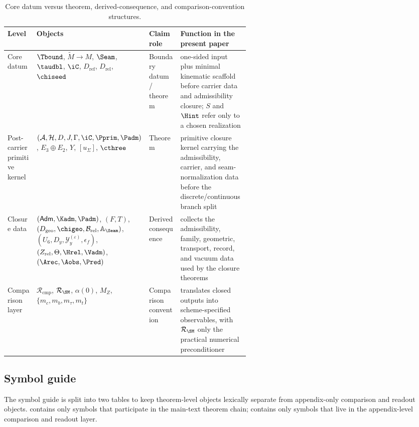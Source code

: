 \begin{table}[t]
\centering
\small
\begin{tabularx}{\linewidth}{@{}>{\raggedright\arraybackslash}p{0.12\linewidth}>{\raggedright\arraybackslash}p{0.31\linewidth}>{\raggedright\arraybackslash}p{0.13\linewidth}Y@{}}
\toprule
Level & Objects & Claim role & Function in the present paper \\
\midrule
Core datum & $\Tbound$, $\widetilde M\to M$, $\Seam$, $\taudbl$, $\iC$, $D_{\mathrm{ref}}$, $D_{\mathrm{rel}}$, $\chiseed$ & Boundary datum / theorem & one-sided input plus minimal kinematic scaffold before carrier data and admissibility closure; $S$ and $\Hint$ refer only to a chosen realization \\
Post-carrier primitive kernel & $(\mathcal A,\mathcal H,D,J,\Gamma,\iC,\Pprim,\Padm)$, $E_3\oplus E_2$, $Y$, $[u_\Sigma]$, $\cthree$ & Theorem & primitive closure kernel carrying the admissibility, carrier, and seam-normalization data before the discrete/continuous branch split \\
Closure data & $(\mathsf{Adm},\Kadm,\Padm)$, $(F,T)$, $(D_{\mathrm{geo}},\chigeo,\mathcal B_{\mathrm{rel}},\mathbb A_{\Seam})$, $(U_6,D_y,\mathcal Y_y^{(\varepsilon)},\epsilon_f)$, $(Z_{\mathrm{rel}},\Theta,\Hrel,\Vadm)$, $(\Arec,\Aobs,\Pred)$ & Derived consequence & collects the admissibility, family, geometric, transport, record, and vacuum data used by the closure theorems \\
Comparison layer & $\mathcal R_{\mathrm{cmp}}$, $\mathcal R_{\SM}$, $\alpha(0)$, $M_Z$, $\{m_c,m_b,m_\tau,m_t\}$ & Comparison convention & translates closed outputs into scheme-specified observables, with $\mathcal R_{\SM}$ only the practical numerical preconditioner \\
\bottomrule
\end{tabularx}
\caption{Core datum versus theorem, derived-consequence, and comparison-convention structures.}
\label{tab:layered-datum}
\end{table}

\subsection{Symbol guide}

The symbol guide is split into two tables to keep theorem-level objects lexically separate from
appendix-only comparison and readout objects.  contains only
symbols that participate in the main-text theorem chain; 
contains only symbols that live in the appendix-level comparison and readout layer.

